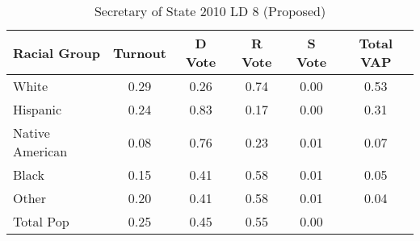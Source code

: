 \begin{table}[htb]
\begin{center}
\caption{Secretary of State 2010 LD 8 (Proposed)}
\label{sos10_vap_ld_8}
\begin{tabular}{lccccc}
  \hline
Racial Group & Turnout & D Vote & R Vote & S Vote & Total VAP \\ 
  \hline
White & 0.29 & 0.26 & 0.74 & 0.00 & 0.53 \\ 
  Hispanic & 0.24 & 0.83 & 0.17 & 0.00 & 0.31 \\ 
  Native American & 0.08 & 0.76 & 0.23 & 0.01 & 0.07 \\ 
  Black & 0.15 & 0.41 & 0.58 & 0.01 & 0.05 \\ 
  Other & 0.20 & 0.41 & 0.58 & 0.01 & 0.04 \\ 
  Total Pop & 0.25 & 0.45 & 0.55 & 0.00 &  \\ 
   \hline
\end{tabular}
\end{center}
\end{table}
